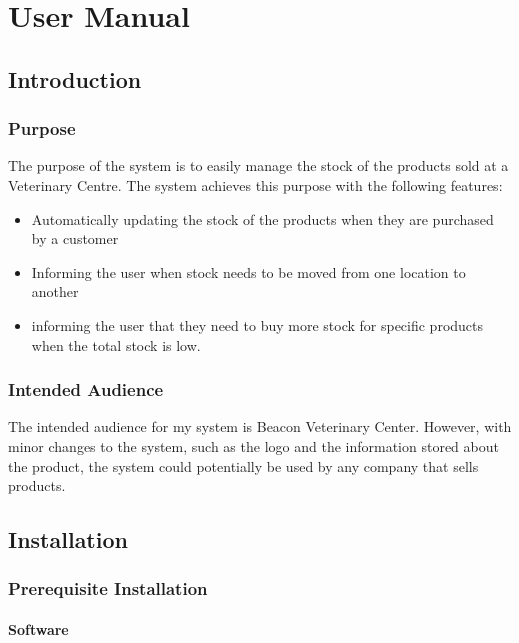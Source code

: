 
\chapter{User Manual}

\startcontents[chapters]

\section{Introduction}

\subsection{Purpose}

The purpose of the system is to easily manage the stock of the products sold at a Veterinary Centre. The system achieves this purpose with the following features:

\begin{itemize}
\item{Automatically updating the stock of the products when they are purchased by a customer}
\item{Informing the user when stock needs to be moved from one location to another}
\item{informing the user that they need to buy more stock for specific products when the total stock is low.}
\end{itemize}

\subsection{Intended Audience}

The intended audience for my system is Beacon Veterinary Center. However, with minor changes to the system, such as the logo and the information stored about the product, the system could potentially be used by any company that sells products. 

\pagebreak

\section{Installation}

\subsection{Prerequisite Installation}
\subsubsection{Software}

